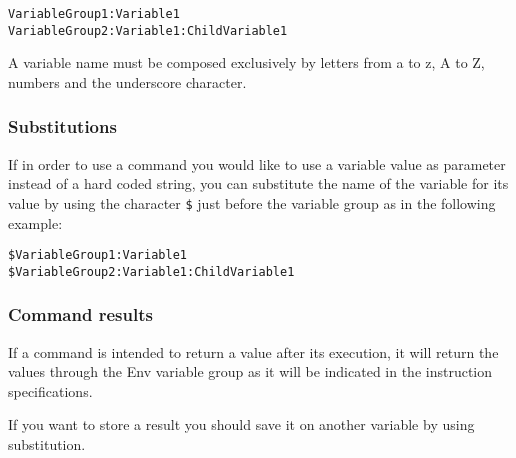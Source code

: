 \begin{verbatim}
VariableGroup1:Variable1
VariableGroup2:Variable1:ChildVariable1
\end{verbatim}

A variable name must be composed exclusively by letters from a to z, A to Z, numbers and the underscore character.

\subsubsection{Substitutions}
If in order to use a command you would like to use a variable value as parameter instead of a hard coded string, you can substitute the name of the variable for its value by using the character \texttt{\$} just before the variable group as in the following example:\lotharpi

\begin{verbatim}
$VariableGroup1:Variable1
$VariableGroup2:Variable1:ChildVariable1
\end{verbatim}

\subsubsection{Command results}
If a command is intended to return a value after its execution, it will return the values through the Env variable group as it will be indicated in the instruction specifications.

If you want to store a result you should save it on another variable by using substitution.\lotharpi
